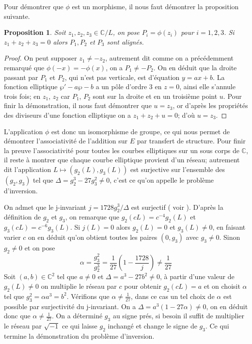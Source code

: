 \documentclass{article}
\newtheorem{proposition}{Proposition}
\begin{document}
Pour démontrer que $\phi$ est un morphisme, il nous faut démontrer la proposition suivante.
\begin{proposition}
Soit $z_{1}, z_{2}, z_{3} \in \mathbb{C}/L$, on pose $P_{i} = \phi(z_{i})$ pour $i=1,2,3$.
Si $z_{1} + z_{2} + z_{3} = 0$ alors $P_{1}, P_{2}$ et $P_{3}$ sont alignés.
\end{proposition}

\begin{proof}
On peut supposer $z_{1} \neq -z_{2}$, autrement dit comme on a
précédemment remarqué que $\phi(-x) = -\phi(x)$, on a $P_{1} \neq -P_{2}$. On en déduit que la droite passant
par $P_{1}$ et $P_{2}$, qui n'est pas verticale, est d'équation $y = ax+b$. La fonction elliptique
$\wp' - a\wp - b$ a un pôle d'ordre $3$ en $z=0$, ainsi elle s'annule trois fois; en $z_{1}$, $z_{2}$ car
$P_{1}$, $P_{2}$ sont sur la droite et en un troisième point $u$. Pour finir la démonstration, il nous faut
démontrer que $u = z_{3}$, or d'après les propriétés des diviseurs d'une fonction elliptique
on a $z_{1} + z_{2} + u = 0$; d'où $u = z_{3}$.
\end{proof}

L'application $\phi$ est donc un isomorphisme de groupe, ce qui nous permet de démontrer l'associativité
de l'addition sur $E$ par transfert de structure. Pour finir la preuve l'associativité pour toutes
les courbes elliptiques sur un sous corps de $\mathbb{C}$, il reste à
montrer que chaque courbe elliptique provient d'un réseau; autrement dit l'application 
$L \longmapsto (g_{2}(L), g_{3}(L))$ est surjective sur l'ensemble des $(g_{2}, g_{3})$ tel que 
$\Delta = g_{2}^3 - 27g_{3}^2 \neq 0$, c'est ce qu'on appelle le problème d'inversion.

On admet que le j-invariant $j = 1728g_{2}^3/\Delta$ est surjectif ( voir \cite{serre_cours_1994} ).
D'après la définition de $g_{2}$ et $g_{3}$, on remarque que $g_{2}(cL) = c^{-4}g_{2}(L)$ et $g_{3}(cL) = c^{-6}g_{3}(L)$.
Si $j(L) = 0$ alors $g_{2}(L) = 0$ et $g_{3}(L) \neq 0$, en faisant varier $c$ on en déduit qu'on obtient toutes
les paires $(0, g_{3})$ avec $g_{3} \neq 0$. Sinon $g_{2} \neq 0$ et on pose
\begin{equation*}
\alpha = \frac{g_{3}^2}{g_{2}^3} = \frac{1}{27}(1-\frac{1728}{j}) \neq \frac{1}{27}
\end{equation*}
Soit $(a,b)\in \mathbb{C}^2$ tel que $a \neq 0$ et $\Delta = a^3 - 27b^2 \neq 0$, 
à partir d'une valeur de $g_{2}(L) \neq 0$ on multiplie le réseau par $c$ pour obtenir $g_{2}(cL)=a$
et on choisit $\alpha$ tel que $g_{3}^2 = \alpha a^3 = b^2$. Vérifions que $\alpha \neq \frac{1}{27}$, dans ce cas
un tel choix de $\alpha$ est possible par surjectivité du j-invariant. On a $\Delta = a^3(1 - 27\alpha) \neq 0$,
on en déduit donc que $\alpha \neq \frac{1}{27}$. On a déterminé $g_{3}$ au signe prés, si besoin il suffit
de multiplier le réseau par $\sqrt{-1}$ ce qui laisse $g_{2}$ inchangé et change le signe de $g_{3}$. Ce qui
termine la démonstration du problème d'inversion.
\end{document}
